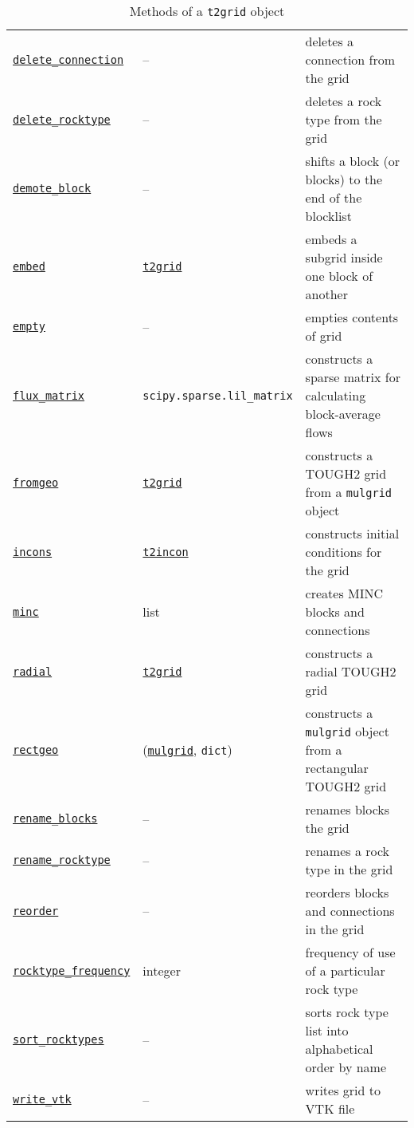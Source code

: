\begin{table}
\begin{center}
\begin{tabular}{|l|l|p{65mm}|}
      \hyperref[sec:t2grid:delete_connection]{\texttt{delete\_connection}} & -- & deletes a connection from the grid\\
      \hyperref[sec:t2grid:delete_rocktype]{\texttt{delete\_rocktype}} & -- & deletes a rock type from the grid\\
      \hyperref[sec:t2grid:demote_block]{\texttt{demote\_block}} & -- & shifts a block (or blocks) to the end of the blocklist\\
      \hyperref[sec:t2grid:embed]{\texttt{embed}} & \hyperref[t2grids]{\texttt{t2grid}} & embeds a subgrid inside one block of another \\
      \hyperref[sec:t2grid:empty]{\texttt{empty}} & -- & empties contents of grid\\
      \hyperref[sec:t2grid:flux_matrix]{\texttt{flux\_matrix}} & \texttt{scipy.sparse.lil\_matrix} & constructs a sparse matrix for calculating block-average flows \\
      \hyperref[sec:t2grid:fromgeo]{\texttt{fromgeo}} & \hyperref[t2grids]{\texttt{t2grid}} & constructs a TOUGH2 grid from a \texttt{mulgrid} object\\
      \hyperref[sec:t2grid:incons]{\texttt{incons}} & \hyperref[incons]{\texttt{t2incon}} & constructs initial conditions for the grid\\
      \hyperref[sec:t2grid:MINC]{\texttt{minc}} & list & creates MINC blocks and connections\\
      \hyperref[sec:t2grid:radial]{\texttt{radial}} & \hyperref[t2grids]{\texttt{t2grid}} & constructs a radial TOUGH2 grid\\
      \hyperref[sec:t2grid:rectgeo]{\texttt{rectgeo}} & (\hyperref[mulgrids]{\texttt{mulgrid}}, \texttt{dict}) & constructs a \texttt{mulgrid} object from a rectangular TOUGH2 grid\\
      \hyperref[sec:t2grid:rename_blocks]{\texttt{rename\_blocks}} & -- & renames blocks the grid\\
      \hyperref[sec:t2grid:rename_rocktype]{\texttt{rename\_rocktype}} & -- & renames a rock type in the grid\\
      \hyperref[sec:t2grid:reorder]{\texttt{reorder}} & -- & reorders blocks and connections in the grid\\
      \hyperref[sec:t2grid:rocktype_frequency]{\texttt{rocktype\_frequency}} & integer & frequency of use of a particular rock type\\
      \hyperref[sec:t2grid:sort_rocktypes]{\texttt{sort\_rocktypes}} & -- & sorts rock type list into alphabetical order by name\\
      \hyperref[sec:t2grid:write_vtk]{\texttt{write\_vtk}} & -- & writes grid to VTK file\\
      \hline
    \end{tabular}
    \caption{Methods of a \texttt{t2grid} object}
    \label{tb:t2grid_methods}
  \end{center}
\end{table}

